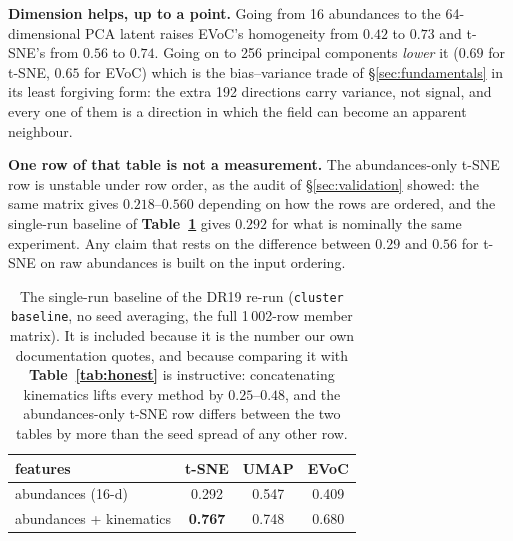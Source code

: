 \textbf{Dimension helps, up to a point.} Going from 16 abundances to the
64-dimensional PCA latent raises EVoC's homogeneity from $0.42$ to $0.73$ and
t-SNE's from $0.56$ to $0.74$. Going on to 256 principal components
\emph{lower} it ($0.69$ for t-SNE, $0.65$ for EVoC) which is the bias--variance
trade of \S\ref{sec:fundamentals} in its least forgiving form: the extra 192
directions carry variance, not signal, and every one of them is a direction in
which the field can become an apparent neighbour.

\textbf{One row of that table is not a measurement.} The abundances-only
t-SNE row is unstable under row order, as the audit of \S\ref{sec:validation}
showed: the same matrix gives $0.218$--$0.560$ depending on how the rows are
ordered, and the single-run baseline of \textbf{Table~\ref{tab:baseline}}
gives $0.292$ for what is nominally the same experiment. Any claim that rests
on the difference between $0.29$ and $0.56$ for t-SNE on raw abundances is
built on the input ordering.

\begin{table}[htbp]
\centering
\small
{}
\begin{tabular}{@{}lccc@{}}
\toprule
features & t-SNE & UMAP & EVoC \\
\midrule
abundances (16-d)          & 0.292 & 0.547 & 0.409 \\
abundances + kinematics    & \textbf{0.767} & 0.748 & 0.680 \\
\bottomrule
\end{tabular}
\caption{The single-run baseline of the DR19 re-run
(\texttt{cluster baseline}, no seed averaging, the full 1\,002-row member
matrix). It is included because it is the number our own documentation quotes,
and because comparing it with \textbf{Table~\ref{tab:honest}} is instructive:
concatenating kinematics lifts every method by $0.25$--$0.48$, and the
abundances-only t-SNE row differs between the two tables by more than the seed
spread of any other row.}
\label{tab:baseline}
\end{table}

